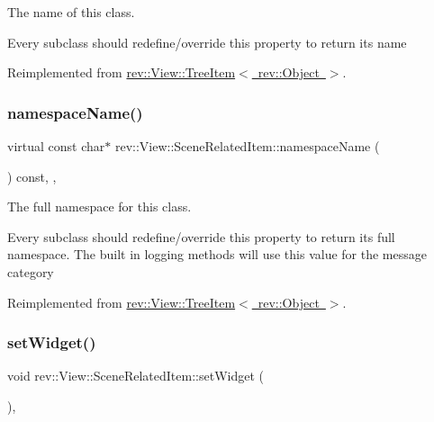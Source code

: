 The name of this class. 

Every subclass should redefine/override this property to return its name 

Reimplemented from \mbox{\hyperlink{classrev_1_1_view_1_1_tree_item_a8a12a6ceece6cab7a2299da2b5e6a54b}{rev\+::\+View\+::\+Tree\+Item$<$ rev\+::\+Object $>$}}.

\mbox{\label{classrev_1_1_view_1_1_scene_related_item_a627f509d311402581f9fafadd2e7e014}} 
\subsubsection{\texorpdfstring{namespaceName()}{namespaceName()}}
{\footnotesize\ttfamily virtual const char$\ast$ rev\+::\+View\+::\+Scene\+Related\+Item\+::namespace\+Name (\begin{DoxyParamCaption}{ }\end{DoxyParamCaption}) const\hspace{0.3cm}{\ttfamily [inline]}, {\ttfamily [override]}, {\ttfamily [virtual]}}



The full namespace for this class. 

Every subclass should redefine/override this property to return its full namespace. The built in logging methods will use this value for the message category 

Reimplemented from \mbox{\hyperlink{classrev_1_1_view_1_1_tree_item_a3bb552a87176f4b12848e43dfdd287b2}{rev\+::\+View\+::\+Tree\+Item$<$ rev\+::\+Object $>$}}.

\mbox{\label{classrev_1_1_view_1_1_scene_related_item_a95e05efcaa12dd3deb2cabd7c3bdd343}} 
\subsubsection{\texorpdfstring{setWidget()}{setWidget()}}
{\footnotesize\ttfamily void rev\+::\+View\+::\+Scene\+Related\+Item\+::set\+Widget (\begin{DoxyParamCaption}{ }\end{DoxyParamCaption})\hspace{0.3cm}{\ttfamily [override]}, {\ttfamily [virtual]}}



